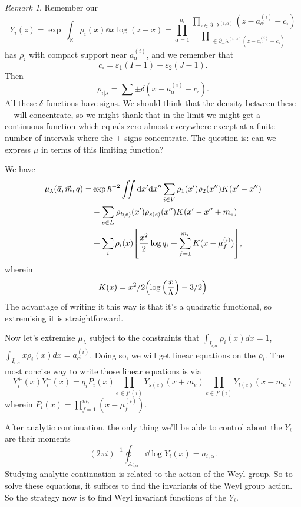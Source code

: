 \documentclass[leqno, openany]{memoir}
\theoremstyle{definition}
\theoremstyle{remark}
\newtheorem{rmk}[thm]{Remark}
\theoremstyle{plain}
\theoremstyle{definition}
\theoremstyle{remark}
\newcommand{\ep}{\varepsilon}
\begin{document}
\begin{rmk}
Remember our 
\[
Y_i(z) = \exp\, \int_\mathbb{R} \rho_i(x) \dd x \log(z-x) = \prod_{\alpha = 1}^{n_i} \frac{\prod_{\square \in \partial_+ \lambda^{(i,\alpha)}} (z - a_\alpha^{(i)} - c_\square)}{\prod_{\square \in \partial_- \lambda^{(i,\alpha)} (z - a_\alpha^{(i)} - c_\square)}}
\]
has $\rho_i$ with compact support near $a_\alpha^{(i)}$, and we remember that 
\[
c_\square = \ep_1(I- 1) + \ep_2(J-1).
\]
Then 
\[
\rho_{i|\lambda} = \sum \pm \delta(x - a_\alpha^{(i)} - c_\square).
\]
All these $\delta$-functions have signs.  We should think that the density between these $\pm$ will concentrate,
so we might thank that in the limit we might get a continuous function which equals zero almost everywhere except at a finite number of intervals where the $\pm$ signs concentrate.
The question is: can we express $\mu$ in terms of this limiting function?

We have 
\begin{align*}
    \mu_{\lambda}(\vec{a},\vec{m},q) =&{} \exp \hbar^{-2} \iint \dd x' \dd x'' \sum_{i \in V} \rho_1(x') \rho_2(x'') K(x' - x'') \\ 
    &- \sum_{e \in E} \rho_{t(e)} (x') \rho_{s(e)}(x'') K(x' - x'' + m_e) \\
    &+ \sum_i \rho_i(x) \qty[ \frac{x^2}{2} \log q_i + \sum_{f= 1}^{m_i} K(x - \mu_f^{(i)})],
\end{align*}
wherein 
\[
K(x) = x^2/2 \qty( \log\qty(\frac{x}{\Lambda}) - 3/2)
\]
The advantage of writing it this way is that it's a quadratic functional, so extremising it is straightforward.
\end{rmk}


Now let's extremise $\mu_\lambda$ subject to the constraints that $\int_{I_{i,\alpha}} \rho_i(x) dx = 1$, $\int_{I_{i,\alpha}} x \rho_i(x) dx = a_\alpha^{(i)}$.
Doing so, we will get linear equations on the $\rho_i$. 
The most concise way to write those linear equations is via 
\[
Y_i^+(x) Y_i^-(x) = q_i P_i(x)  \prod_{e \in f'(i)} Y_{s(e)} (x + m_e) \prod_{e \in f'(i)} Y_{t(e)} (x - m_e)
\]
wherein $P_i(x) = \prod_{f = 1}^{m_i} (x - \mu_f^{(i)})$.

After analytic continuation, the only thing we'll be able to control about the $Y_i$ are their moments
\[
(2\pi i )^{-1} \oint_{A_{i,\alpha}} \dd \log Y_i(x) = a_{i,\alpha}.
\]
Studying analytic continuation is related to the action of the Weyl group. 
So to solve these equations, it suffices to find the invariants of the Weyl group action.
So the strategy now is to find Weyl invariant functions of the $Y_i$. 
\end{document}
